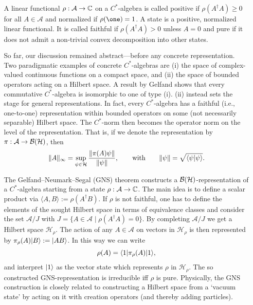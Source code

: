 \documentclass[11pt,a4paper]{article}
\theoremstyle{plain}
\theoremstyle{definition}
\theoremstyle{remark}
\numberwithin{equation}{section}
\begin{document}
A linear functional $\rho:\mathcal{A}\to \mathbb{C}$ on a $C^\ast$-algebra is called positive if $\rho(A^\dagger A)\ge 0$ for all $A\in \mathcal{A}$ and normalized if $\rho(\one)=1$. A state is a positive, normalized linear functional. It is called faithful if $\rho(A^\dagger A)>0$ unless $A=0$ and pure if it does not admit a non-trivial convex decomposition into other states.

So far, our discussion remained abstract---before any concrete representation. Two paradigmatic examples of concrete $C^\ast$-algebras are (i) the space of complex-valued continuous functions on a compact space, and (ii) the space of bounded operators acting on a Hilbert space. A result by Gelfand shows that every commutative $C^\ast$-algebra is isomorphic to one of type (i). (ii) instead sets the stage for general representations. In fact, every $C^\ast$-algebra has a faithful (i.e., one-to-one) representation within bounded operators on some (not necessarily separable) Hilbert space. The $C^\ast$-norm then becomes the operator norm on the level of the representation. That is, if we denote the representation by $\pi:\mathcal{A}\to \mathcal{B}(\mathcal{H})$, then
\begin{equation}
    \|A\|_\infty = \sup_{\psi\in \mathcal{H}} \frac{\|\pi(A)\psi\|}{\|\psi\|},
    \qquad
    \text{with}\qquad
    \|\psi\|=\sqrt{\langle\psi|\psi\rangle}.
\end{equation}

The Gelfand--Neumark--Segal (GNS) theorem constructs a $\mathcal{B}(\mathcal{H})$-representation of a $C^\ast$-algebra starting from a state $\rho:\mathcal{A}\to \mathbb{C}$. The main idea is to define a scalar product via $\langle A,B\rangle:=\rho(A^\dagger B)$. If $\rho$ is not faithful, one has to define the elements of the sought Hilbert space in terms of equivalence classes and consider the set $\mathcal{A}/J$ with $J=\{A\in \mathcal{A}\mid \rho(A^\dagger A)=0\}$. By completing $\mathcal{A}/J$ we get a Hilbert space $\mathcal{H}_\rho$. The action of any $A\in \mathcal{A}$ on vectors in $\mathcal{H}_\rho$ is then represented by $\pi_\rho(A)|B\rangle:=|AB\rangle$. In this way we can write
\begin{equation}
    \rho(A) = \langle1|\pi_\rho(A)|1\rangle,
\end{equation}
and interpret $|1\rangle$ as the vector state which represents $\rho$ in $\mathcal{H}_\rho$. The so constructed GNS-representation is irreducible iff $\rho$ is pure. Physically, the GNS construction is closely related to constructing a Hilbert space from a `vacuum state' by acting on it with creation operators (and thereby adding particles).
\end{document}
